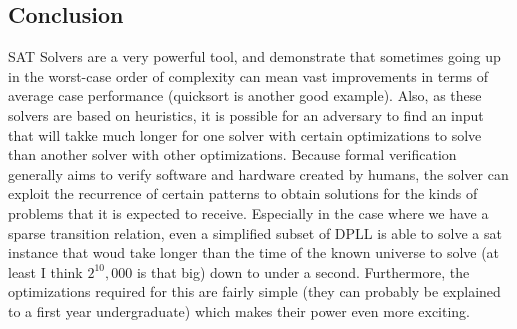 \documentclass[11pt]{article}
\begin{document}
\begin{flushleft}
\section{Conclusion} SAT Solvers are a very powerful tool, and demonstrate that sometimes going up in the worst-case order of complexity can mean vast improvements in terms of average case performance (quicksort is another good example). Also, as these solvers are based on heuristics, it is possible for an adversary to find an input that will takke much longer for one solver with certain optimizations to solve than another solver with other optimizations. Because formal verification generally aims to verify software and hardware created by humans, the solver can exploit the recurrence of certain patterns to obtain solutions for the kinds of problems that it is expected to receive. Especially in the case where we have a sparse transition relation, even a simplified subset of DPLL is able to solve a sat instance that woud take longer than the time of the known universe to solve (at least I think $2^10,000$ is that big) down to under a second. Furthermore, the optimizations required for this are fairly simple (they can probably be explained to a first year undergraduate) which makes their power even more exciting.
\end{flushleft}
\end{document}
